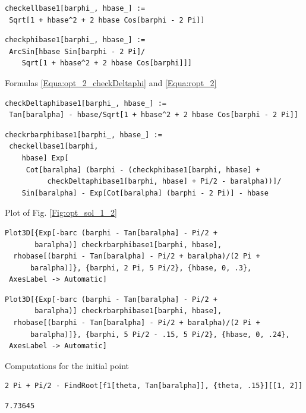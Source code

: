 \documentclass[reqno]{amsart}
\theoremstyle{definition} \newtheorem{definition}{Definition}[section]
\theoremstyle{definition} \newtheorem{remark}[definition]{Remark}
\theoremstyle{plain} \newtheorem{lemma}[definition]{Lemma}
\theoremstyle{plain} \newtheorem{proposition}[definition]{Proposition}
\theoremstyle{plain} \newtheorem{theorem}[definition]{Theorem}
\theoremstyle{plain} \newtheorem{corollary}[definition]{Corollary}
\theoremstyle{definition} \newtheorem{example}[definition]{Example}
\theoremstyle{plain} \newtheorem{claim}[clai]{Claim}
\theoremstyle{definition} \newtheorem{assumption}[definition]{Assumption}
\theoremstyle{definition} \newtheorem{observation}[definition]{Observation}
\newcommand{\1}{\mathbbm 1}
\newcommand{\smed}{\medskip}
\newcommand{\sbig}{\bigskip}
\numberwithin{equation}{section} %
\theoremstyle{plain} \newtheorem*{theorem*}{Theorem}
\theoremstyle{plain} \newtheorem{mthm}[maintheorem]{Main Theorem}
\theoremstyle{plain} \newtheorem*{mthm*}{Main Theorem}
\theoremstyle{plain} \newtheorem*{conjecture*}{Conjecture}
\theoremstyle{plain} \newtheorem{conjecture}[definition]{Conjecture}
\theoremstyle{plain} \newtheorem*{problem*}{Problem}
\begin{document}
\sbig


\sbig


\sbig

\begin{verbatim}
checkellbase1[barphi_, hbase_] := 
 Sqrt[1 + hbase^2 + 2 hbase Cos[barphi - 2 Pi]]
\end{verbatim}
\begin{verbatim}
checkphibase1[barphi_, hbase_] := 
 ArcSin[hbase Sin[barphi - 2 Pi]/
    Sqrt[1 + hbase^2 + 2 hbase Cos[barphi]]]
\end{verbatim}
\smed
Formulas \eqref{Equa:opt_2_checkDeltaphi} and \eqref{Equa:ropt_2}
\smed
\begin{verbatim}
checkDeltaphibase1[barphi_, hbase_] := 
 Tan[baralpha] - hbase/Sqrt[1 + hbase^2 + 2 hbase Cos[barphi - 2 Pi]]
\end{verbatim}
\begin{verbatim}
checkrbarphibase1[barphi_, hbase_] := 
 checkellbase1[barphi, 
    hbase] Exp[
     Cot[baralpha] (barphi - (checkphibase1[barphi, hbase] + 
          checkDeltaphibase1[barphi, hbase] + Pi/2 - baralpha))]/
    Sin[baralpha] - Exp[Cot[baralpha] (barphi - 2 Pi)] - hbase
\end{verbatim}
\smed
Plot of Fig. \ref{Fig:opt_sol_1_2}
\smed
\begin{verbatim}
Plot3D[{Exp[-barc (barphi - Tan[baralpha] - Pi/2 + 
       baralpha)] checkrbarphibase1[barphi, hbase], 
  rhobase[(barphi - Tan[baralpha] - Pi/2 + baralpha)/(2 Pi + 
      baralpha)]}, {barphi, 2 Pi, 5 Pi/2}, {hbase, 0, .3}, 
 AxesLabel -> Automatic]
\end{verbatim}
\begin{verbatim}
Plot3D[{Exp[-barc (barphi - Tan[baralpha] - Pi/2 + 
       baralpha)] checkrbarphibase1[barphi, hbase], 
  rhobase[(barphi - Tan[baralpha] - Pi/2 + baralpha)/(2 Pi + 
      baralpha)]}, {barphi, 5 Pi/2 - .15, 5 Pi/2}, {hbase, 0, .24}, 
 AxesLabel -> Automatic]
\end{verbatim}
\smed
Computations for the initial point
\smed
\begin{verbatim}
2 Pi + Pi/2 - FindRoot[f1[theta, Tan[baralpha]], {theta, .15}][[1, 2]]
\end{verbatim}
\begin{verbatim}
7.73645
\end{verbatim}
\end{document}
